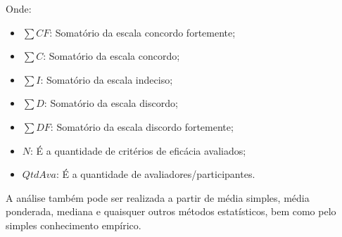 Onde: 
\begin{itemize}
    \item $\sum CF$: Somatório da escala concordo fortemente;
    \item $\sum C$: Somatório da escala concordo;
    \item $\sum I$: Somatório da escala indeciso;
    \item $\sum D$: Somatório da escala discordo;
    \item $\sum DF$: Somatório da escala discordo fortemente;
    \item $N$: É a quantidade de critérios de eficácia avaliados;
    \item $QtdAva$: É a quantidade de avaliadores/participantes.
\end{itemize}

A análise também pode ser realizada a partir de média simples, média ponderada, mediana e quaisquer outros métodos estatísticos, bem como pelo simples conhecimento empírico.






